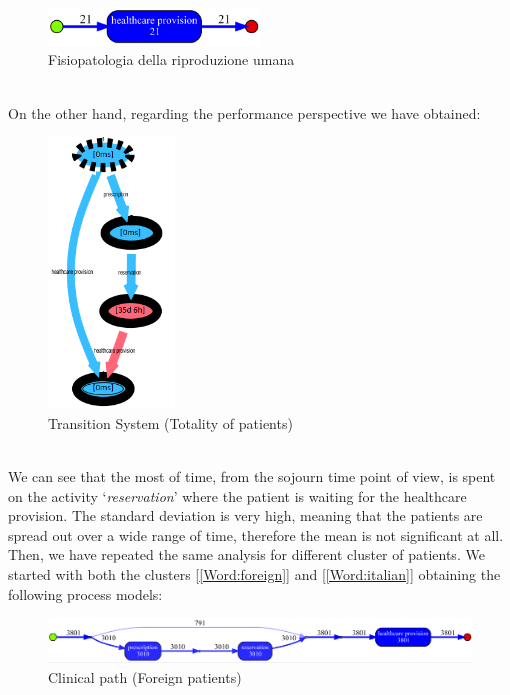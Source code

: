 \begin{figure} [htbp]
\includegraphics[width = 0.5\textwidth, keepaspectratio]{AmbulatoriInductiveVisualMiner5701}
\caption{Fisiopatologia della riproduzione umana}
\end{figure}\\
On the other hand, regarding the performance perspective we have obtained:
\begin{figure} [htbp]
\includegraphics[width=0.3\textwidth, keepaspectratio]{AmbulatoriTransitionSystemSojourn}
\caption{Transition System (Totality of patients)}
\end{figure}\\
We can see that the most of time, %
from the sojourn time point of view, is spent on the activity `\textit{reservation}' where the patient is waiting for the healthcare provision. The standard deviation is very high, meaning that the patients are spread out over a wide range of time, therefore the mean is not significant at all. Then, we have repeated the same analysis for different cluster of patients. We started with both the clusters [\ref{Word:foreign}] and [\ref{Word:italian}] obtaining the following process models:
\begin{figure} [htbp]
\includegraphics[width=\textwidth , keepaspectratio]{AmbulatoriInductiveVisualMinerForeigns}
\caption{Clinical path (Foreign patients)}
\end{figure}\\
